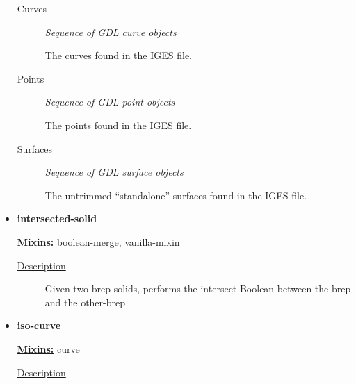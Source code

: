\documentclass [11pt]{book}
\begin{document}
\begin{itemize}
\begin{description}
\item [Curves]
\emph{Sequence of GDL curve objects}

 The curves found in the IGES file.




\item [Points]
\emph{Sequence of GDL point objects}

 The points found in the IGES file.




\item [Surfaces]
\emph{Sequence of GDL surface objects}

 The untrimmed ``standalone'' surfaces found in the IGES file.




\end{description}







\item {}
\label{prim:intersected-solid}
\textbf{intersected-solid}


\textbf{
\underline{Mixins:}} boolean-merge, vanilla-mixin





\begin{description}

\item [
\underline{Description}]


Given two brep solids, performs the intersect Boolean between the brep and the other-brep



\end{description}









\item {}
\label{prim:iso-curve}
\textbf{iso-curve}


\textbf{
\underline{Mixins:}} curve





\begin{description}

\item [
\underline{Description}]



\end{description}
\end{itemize}
\end{document}
